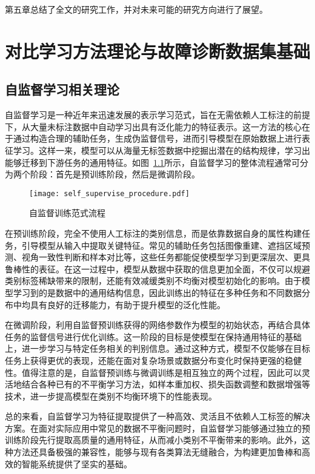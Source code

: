 \documentclass[master]{thesis-uestc}
\begin{document}
第五章总结了全文的研究工作，并对未来可能的研究方向进行了展望。


\chapter{对比学习方法理论与故障诊断数据集基础}
\section{自监督学习相关理论}
自监督学习是一种近年来迅速发展的表示学习范式，旨在无需依赖人工标注的前提下，从大量未标注数据中自动学习出具有泛化能力的特征表示。这一方法的核心在于通过构造合理的辅助任务，生成伪监督信号，进而引导模型在原始数据上进行表征学习。这样一来，模型可以从海量无标签数据中挖掘出潜在的结构规律，学习出能够迁移到下游任务的通用特征。如图~\ref{self_supervise_procedure}所示，自监督学习的整体流程通常可分为两个阶段：首先是预训练阶段，然后是微调阶段。

\begin{figure}[h]
    \texttt{[image: self\_supervise\_procedure.pdf]}
    \caption{自监督训练范式流程}
    \label{self_supervise_procedure}
\end{figure}

在预训练阶段，完全不使用人工标注的类别信息，而是依靠数据自身的属性构建任务，引导模型从输入中提取关键特征。常见的辅助任务包括图像重建、遮挡区域预测、视角一致性判断和样本对比等，这些任务都能促使模型学习到更深层次、更具鲁棒性的表征。在这一过程中，模型从数据中获取的信息更加全面，不仅可以规避类别标签稀缺带来的限制，还能有效减缓类别不均衡对模型初始化的影响。由于模型学习到的是数据中的通用结构信息，因此训练出的特征在多种任务和不同数据分布中均具有良好的迁移能力，有助于提升模型的泛化性能。

在微调阶段，利用自监督预训练获得的网络参数作为模型的初始状态，再结合具体任务的监督信号进行优化训练。这一阶段的目标是使模型在保持通用特征的基础上，进一步学习与特定任务相关的判别信息。通过这种方式，模型不仅能够在目标任务上获得更优的表现，还能在面对复杂场景或数据分布变化时保持更强的稳健性。值得注意的是，自监督预训练与微调训练是相互独立的两个过程，因此可以灵活地结合各种已有的不平衡学习方法，如样本重加权、损失函数调整和数据增强等技术，进一步提高模型在类别不均衡环境下的性能表现。

总的来看，自监督学习为特征提取提供了一种高效、灵活且不依赖人工标签的解决方案。在面对实际应用中常见的数据不平衡问题时，自监督学习能够通过独立的预训练阶段先行提取高质量的通用特征，从而减小类别不平衡带来的影响。此外，这种方法还具备极强的兼容性，能够与现有各类算法无缝融合，为构建更加鲁棒和高效的智能系统提供了坚实的基础。
\end{document}
